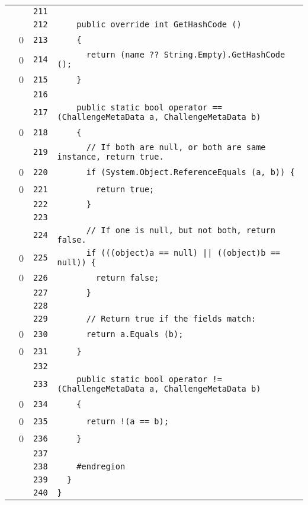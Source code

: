 \documentclass[a4paper,10pt]{article}
\begin{document}
\begin{longtable}[l]{lrrl}
\cellcolor{gray} &  & \verb~211~ & \verb~~\\
\cellcolor{gray} &  & \verb~212~ & \verb~    public override int GetHashCode ()~\\
\cellcolor{red} & 0 & \verb~213~ & \verb~    {~\\
\cellcolor{red} & 0 & \verb~214~ & \verb~      return (name ?? String.Empty).GetHashCode ();~\\
\cellcolor{red} & 0 & \verb~215~ & \verb~    }~\\
\cellcolor{gray} &  & \verb~216~ & \verb~~\\
\cellcolor{gray} &  & \verb~217~ & \verb~    public static bool operator == (ChallengeMetaData a, ChallengeMetaData b)~\\
\cellcolor{red} & 0 & \verb~218~ & \verb~    {~\\
\cellcolor{gray} &  & \verb~219~ & \verb~      // If both are null, or both are same instance, return true.~\\
\cellcolor{red} & 0 & \verb~220~ & \verb~      if (System.Object.ReferenceEquals (a, b)) {~\\
\cellcolor{red} & 0 & \verb~221~ & \verb~        return true;~\\
\cellcolor{gray} &  & \verb~222~ & \verb~      }~\\
\cellcolor{gray} &  & \verb~223~ & \verb~~\\
\cellcolor{gray} &  & \verb~224~ & \verb~      // If one is null, but not both, return false.~\\
\cellcolor{red} & 0 & \verb~225~ & \verb~      if (((object)a == null) || ((object)b == null)) {~\\
\cellcolor{red} & 0 & \verb~226~ & \verb~        return false;~\\
\cellcolor{gray} &  & \verb~227~ & \verb~      }~\\
\cellcolor{gray} &  & \verb~228~ & \verb~~\\
\cellcolor{gray} &  & \verb~229~ & \verb~      // Return true if the fields match:~\\
\cellcolor{red} & 0 & \verb~230~ & \verb~      return a.Equals (b);~\\
\cellcolor{red} & 0 & \verb~231~ & \verb~    }~\\
\cellcolor{gray} &  & \verb~232~ & \verb~~\\
\cellcolor{gray} &  & \verb~233~ & \verb~    public static bool operator != (ChallengeMetaData a, ChallengeMetaData b)~\\
\cellcolor{red} & 0 & \verb~234~ & \verb~    {~\\
\cellcolor{red} & 0 & \verb~235~ & \verb~      return !(a == b);~\\
\cellcolor{red} & 0 & \verb~236~ & \verb~    }~\\
\cellcolor{gray} &  & \verb~237~ & \verb~~\\
\cellcolor{gray} &  & \verb~238~ & \verb~    #endregion~\\
\cellcolor{gray} &  & \verb~239~ & \verb~  }~\\
\cellcolor{gray} &  & \verb~240~ & \verb~}~\\
\end{longtable}
\newpage
\end{document}
